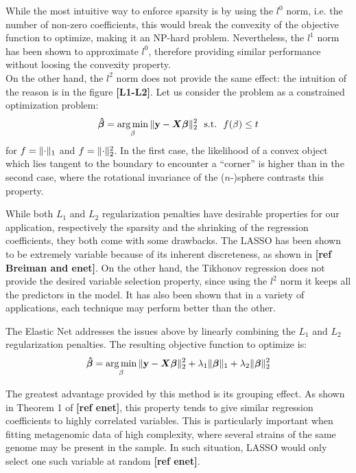 While the most intuitive way to enforce sparsity is by using the $l^0$ norm, i.e. the number of non-zero coefficients, this would break the convexity of the objective function to optimize, making it an NP-hard problem. Nevertheless, the $l^1$ norm has been shown to approximate $l^0$, therefore providing similar performance without loosing the convexity property.\\
On the other hand, the $l^2$ norm does not provide the same effect: the intuition of the reason is in the figure \textbf{[L1-L2]}. Let us consider the problem as a constrained optimization problem:
\begin{equation*}
    \boldsymbol{\hat{\beta}} = \operatorname*{arg\,min}_{\beta}{\lVert\mathbf{y} - \boldsymbol{X}\boldsymbol{\beta}\rVert_2^2}~~\text{s.t.}~~f(\beta) \leq t
\end{equation*}
for $f=\lVert\cdot\rVert_1$ and $f=\lVert\cdot\rVert_2^2$. In the first case, the likelihood of a convex object which lies tangent to the boundary to encounter a ``corner'' is higher than in the second case, where the rotational invariance of the ($n$-)sphere contrasts this property.

While both $L_1$ and $L_2$ regularization penalties have desirable properties for our application, respectively the sparsity and the shrinking of the regression coefficients, they both come with some drawbacks. The LASSO has been shown to be extremely variable because of its inherent discreteness, as shown in \textbf{[ref Breiman and enet]}. On the other hand, the Tikhonov regression does not provide the desired variable selection property, since using the $l^2$ norm it keeps all the predictors in the model. It has also been shown that in a variety of applications, each technique may perform better than the other.

The Elastic Net addresses the issues above by linearly combining the $L_1$ and $L_2$ regularization penalties. The resulting objective function to optimize is:
\begin{equation*}
    \boldsymbol{\hat{\beta}} = \operatorname*{arg\,min}_{\beta}{\lVert\mathbf{y} - \boldsymbol{X}\boldsymbol{\beta}\rVert_2^2} + \lambda_1 \lVert\boldsymbol{\beta}\rVert_1 + \lambda_2\lVert\boldsymbol{\beta}\rVert_2^2
\end{equation*}

The greatest advantage provided by this method is its grouping effect. As shown in Theorem 1 of \textbf{[ref enet]}, this property tends to give similar regression coefficients to highly correlated variables. This is particularly important when fitting metagenomic data of high complexity, where several strains of the same genome may be present in the sample. In such situation, LASSO would only select one such variable at random \textbf{[ref enet]}.

